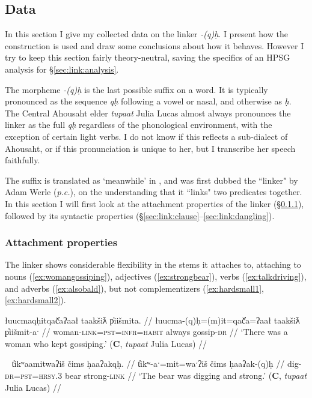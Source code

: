 \subsection{Data} \label{sec:link:data}

In this section I give my collected data on the linker \textit{-(q)ḥ}. I present how the construction is used and draw some conclusions about how it behaves. However I try to keep this section fairly theory-neutral, saving the specifics of an HPSG analysis for \S\ref{sec:link:analysis}.

The morpheme \textit{-(q)ḥ} is the last possible suffix on a word. It is typically pronounced as the sequence \textit{qḥ} following a vowel or nasal, and otherwise as \textit{ḥ}. The Central Ahousaht elder \textit{tupaat} Julia Lucas almost always pronounces the linker as the full \textit{qḥ} regardless of the phonological environment, with the exception of certain light verbs. I do not know if this reflects a sub-dialect of Ahousaht, or if this pronunciation is unique to her, but I transcribe her speech faithfully.

The suffix is translated as `meanwhile' in \cite{sapir1939}, and was first dubbed the ``linker" by Adam Werle (\textit{p.c.}), on the understanding that it ``links" two predicates together. In this section I will first look at the attachment properties of the linker (\S\ref{sec:link:attach}), followed by its syntactic properties (\S\ref{sec:link:clause}--\ref{sec:link:dangling}).

\subsubsection{Attachment properties} \label{sec:link:attach}

The linker shows considerable flexibility in the stems it attaches to, attaching to nouns (\ref{ex:womangossiping}), adjectives (\ref{ex:strongbear}), verbs (\ref{ex:talkdriving}), and adverbs (\ref{ex:alsobald}), but not complementizers (\ref{ex:hardsmall1}, \ref{ex:hardsmall2}).

\ex \label{ex:womangossiping}
\begingl
\glpreamble łuucmaqḥitqač̓aʔaał taakšiƛ p̓iišmita. //
\gla łuucma-(q)ḥ=(m)it=qač̓a=ʔaał taakšiƛ p̓iišmit-aˑ //
\glb woman-\textsc{link}=\textsc{pst}=\textsc{infr}=\textsc{habit} always gossip-\textsc{dr} //
\glft `There was a woman who kept gossiping.' (\textbf{C}, \textit{tupaat} Julia Lucas) //
\endgl
\xe

\ex~ \label{ex:strongbear}
\begingl
\glpreamble t̓ikʷaamitwaʔiš čims ḥaaʔakqḥ. //
\gla t̓ikʷ-aˑ=mit=waˑʔiš čims ḥaaʔak-(q)ḥ //
\glb dig-\textsc{dr}=\textsc{pst}=\textsc{hrsy.3} bear strong-\textsc{link} //
\glft `The bear was digging and strong.' (\textbf{C}, \textit{tupaat} Julia Lucas) //
\endgl
\xe

